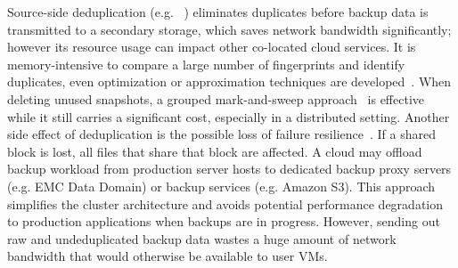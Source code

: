 Source-side deduplication (e.g. ~\cite{Symantec2009})
 eliminates duplicates before backup data is transmitted
to a secondary storage, which saves network bandwidth significantly; however its resource
usage can impact other co-located cloud services. 
It is memory-intensive to compare a large number of fingerprints and identify
duplicates, even optimization or approximation techniques are developed~\cite{Guo2011,Dong2011,extreme_binning09}. 
When deleting unused snapshots, a grouped mark-and-sweep approach~\cite{Guo2011}  
is effective while it still carries a significant cost, especially in a distributed
setting.  Another side effect of deduplication is the possible loss of failure
resilience~\cite{Reliability06}.  
If a shared block is lost, all files that
share that block are affected.  
A cloud may offload backup workload from production 
server hosts to dedicated backup proxy servers (e.g. EMC Data Domain) or
backup services (e.g. Amazon S3). This approach simplifies the cluster 
architecture and 
avoids potential performance degradation to production applications when 
backups are in progress.
However, sending out raw and undeduplicated backup data wastes a huge amount
of network bandwidth that would otherwise be available to user VMs. 

